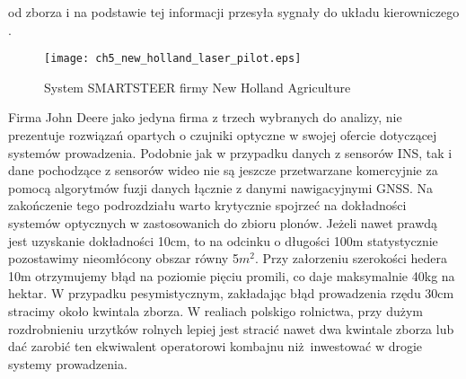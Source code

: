 od zborza i na podstawie tej informacji przesyła sygnały do układu kierowniczego \cite[][strona 18]{NEW_HOLLAND_PLM}.
\begin{figure}[H]
	\centering
	\texttt{[image: ch5\_new\_holland\_laser\_pilot.eps]}
	\caption{System SMARTSTEER firmy New Holland Agriculture}
	\label{new_holland_smartsteer}
\end{figure}
\indent Firma John Deere jako jedyna firma z trzech wybranych do analizy, nie prezentuje rozwiązań opartych o czujniki optyczne w swojej ofercie dotyczącej 
systemów prowadzenia.
\indent Podobnie jak w przypadku danych z sensorów INS, tak i dane pochodzące z sensorów wideo nie są jeszcze przetwarzane komercyjnie
za pomocą algorytmów fuzji danych łącznie z danymi nawigacyjnymi GNSS.  
\indent Na zakończenie tego podrozdziału warto krytycznie spojrzeć na dokładności systemów optycznych w zastosowanich do zbioru plonów.
Jeżeli nawet prawdą jest uzyskanie dokładności 10cm, to na odcinku o długości 100m statystycznie pozostawimy nieomłócony obszar równy 5$m^2$.
Przy załorzeniu szerokości hedera 10m otrzymujemy błąd na poziomie pięciu promili, co daje maksymalnie 40kg na hektar. 
W przypadku pesymistycznym, zakładając błąd prowadzenia rzędu 30cm stracimy około kwintala zborza. 
W realiach polskigo rolnictwa, przy dużym rozdrobnieniu urzytków rolnych lepiej jest stracić nawet dwa kwintale zborza lub 
dać zarobić ten ekwiwalent operatorowi kombajnu niż inwestować w drogie systemy prowadzenia.


